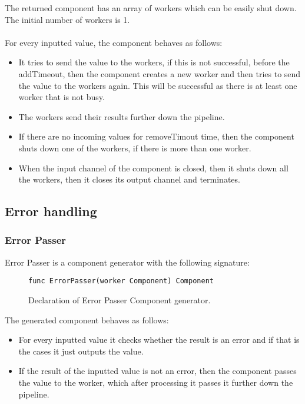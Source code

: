 \documentclass[12pt,a4paper]{article}
\begin{document}
The returned component has an array of workers which can be easily shut down.
The initial number of workers is 1. 
\\
\\
For every inputted value, the component behaves as follows:
\begin{itemize}
	\item It tries to send the value to the workers, if this is not successful, 
				before the addTimeout, then the component creates a new worker and then
				tries to send the value to the workers again. This will be successful as
				there is at least one worker that is not busy.
	\item The workers send their results further down the pipeline.
	\item If there are no incoming values for removeTimout time, then the component
				shuts down one of the workers, if there is more than one worker.
	\item When the input channel of the component is closed, then it shuts down all
				the workers, then it closes its output channel and terminates.

\end{itemize}

\subsection{Error handling}
\subsubsection{Error Passer}
Error Passer is a component generator with the following signature:

\begin{figure}[h]
\centering
\begin{lstlisting}
func ErrorPasser(worker Component) Component
\end{lstlisting}
\caption[scale=1.0]{Declaration of Error Passer Component generator.}
\label{fig:ErrorPasser}
\end{figure}

The generated component behaves as follows:
\begin{itemize}
	\item For every inputted value it checks whether the result is an error
				and if that is the cases it just outputs the value.
	\item If the result of the inputted value is not an error, then the component
				passes the value to the worker, which after processing it passes 
				it further down the pipeline.
\end{itemize}
\end{document}
